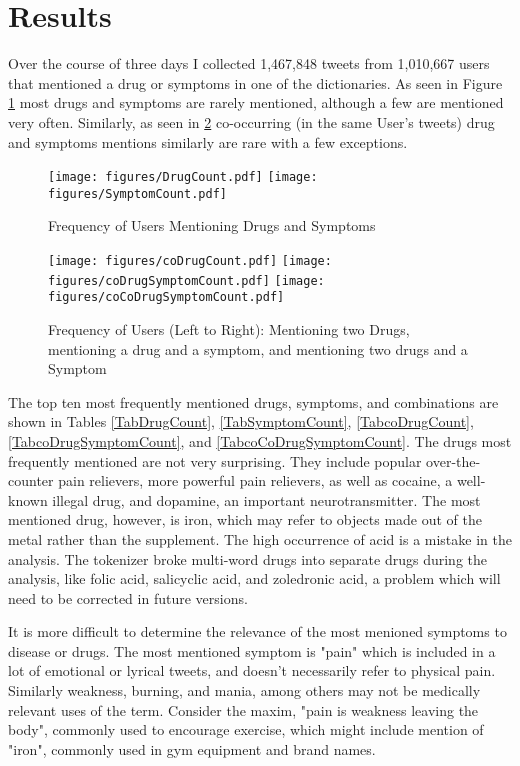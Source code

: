 \documentclass[letterpaper]{article}
\begin{document}
\section{Results}

Over the course of three days I collected 1,467,848 tweets from 1,010,667 users that mentioned a drug or symptoms in one of the dictionaries. As seen in Figure \ref{DrugAndSymptomCounts} most drugs and symptoms are rarely mentioned, although a few are mentioned very often. Similarly, as seen in \ref{CoCounts} co-occurring (in the same User's tweets) drug and symptoms mentions similarly are rare with a few exceptions.

\begin{figure}
\texttt{[image: figures/DrugCount.pdf]}
\texttt{[image: figures/SymptomCount.pdf]}
\label{DrugAndSymptomCounts}
\caption{Frequency of Users Mentioning Drugs and Symptoms}
\end{figure}

\begin{figure}
\texttt{[image: figures/coDrugCount.pdf]}
\texttt{[image: figures/coDrugSymptomCount.pdf]}
\texttt{[image: figures/coCoDrugSymptomCount.pdf]}
\label{CoCounts}
\caption{Frequency of Users (Left to Right): Mentioning two Drugs, mentioning a drug and a symptom, and mentioning two drugs and a Symptom}
\end{figure}

The top ten most frequently mentioned drugs, symptoms, and combinations are shown in Tables \ref{TabDrugCount}, \ref{TabSymptomCount}, \ref{TabcoDrugCount}, \ref{TabcoDrugSymptomCount}, and \ref{TabcoCoDrugSymptomCount}. The drugs most frequently mentioned are not very surprising. They include popular over-the-counter pain relievers, more powerful pain relievers, as well as cocaine, a well-known illegal drug, and dopamine, an important neurotransmitter. The most mentioned drug, however, is iron, which may refer to objects made out of the metal rather than the supplement. The high occurrence of acid is a mistake in the analysis. The tokenizer broke multi-word drugs into separate drugs during the analysis, like folic acid, salicyclic acid, and zoledronic acid, a problem which will need to be corrected in future versions.

It is more difficult to determine the relevance of the most menioned symptoms to disease or drugs. The most mentioned symptom is "pain" which is included in a lot of emotional or lyrical tweets, and doesn't necessarily refer to physical pain. Similarly weakness, burning, and mania, among others may not be medically relevant uses of the term. Consider the maxim, "pain is weakness leaving the body", commonly used to encourage exercise, which might include mention of "iron", commonly used in gym equipment and brand names.
\end{document}
